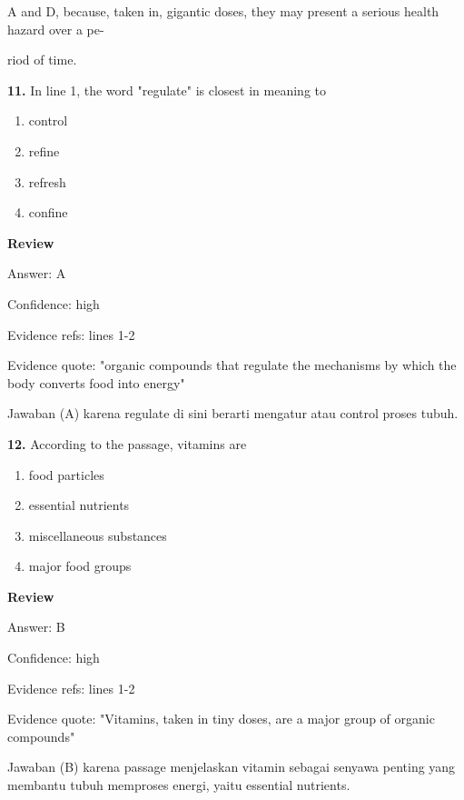 \documentclass[12pt]{article}
\begin{document}
A and D, because, taken in, gigantic doses, they may present a serious health hazard over a pe-\par
riod of time.\par
\endgroup
\medskip
\noindent\textbf{11.} In line 1, the word "regulate" is closest in meaning to
\begin{enumerate}[label=(\Alph*),leftmargin=*,itemsep=0.2em]
\item control
\item refine
\item refresh
\item confine
\end{enumerate}
\par
\begingroup
\setlength{\parskip}{0pt}
\setlength{\parindent}{0pt}
\textbf{Review}\par
Answer: A\par
Confidence: high\par
Evidence refs: lines 1-2\par
Evidence quote: "organic compounds that regulate the mechanisms by which the body converts food into energy"\par
Jawaban (A) karena regulate di sini berarti mengatur atau control proses tubuh.\par
\endgroup
\par
\vspace{0.25\baselineskip}
\noindent\textbf{12.} According to the passage, vitamins are
\begin{enumerate}[label=(\Alph*),leftmargin=*,itemsep=0.2em]
\item food particles
\item essential nutrients
\item miscellaneous substances
\item major food groups
\end{enumerate}
\par
\begingroup
\setlength{\parskip}{0pt}
\setlength{\parindent}{0pt}
\textbf{Review}\par
Answer: B\par
Confidence: high\par
Evidence refs: lines 1-2\par
Evidence quote: "Vitamins, taken in tiny doses, are a major group of organic compounds"\par
Jawaban (B) karena passage menjelaskan vitamin sebagai senyawa penting yang membantu tubuh memproses energi, yaitu essential nutrients.\par
\endgroup
\par
\end{document}
